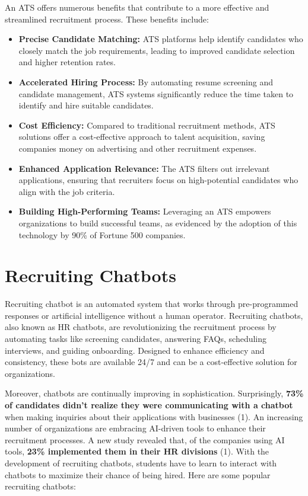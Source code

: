 \documentclass[
]{book}
\begin{document}
An ATS offers numerous benefits that contribute to a more effective and streamlined recruitment process. These benefits include:

\begin{itemize}
\item
  \textbf{Precise Candidate Matching:} ATS platforms help identify candidates who closely match the job requirements, leading to improved candidate selection and higher retention rates.
\item
  \textbf{Accelerated Hiring Process:} By automating resume screening and candidate management, ATS systems significantly reduce the time taken to identify and hire suitable candidates.
\item
  \textbf{Cost Efficiency:} Compared to traditional recruitment methods, ATS solutions offer a cost-effective approach to talent acquisition, saving companies money on advertising and other recruitment expenses.
\item
  \textbf{Enhanced Application Relevance:} The ATS filters out irrelevant applications, ensuring that recruiters focus on high-potential candidates who align with the job criteria.
\item
  \textbf{Building High-Performing Teams:} Leveraging an ATS empowers organizations to build successful teams, as evidenced by the adoption of this technology by 90\% of Fortune 500 companies.
\end{itemize}

\hypertarget{recruiting-chatbots}{%
\chapter{Recruiting Chatbots}\label{recruiting-chatbots}}

Recruiting chatbot is an automated system that works through pre-programmed responses or artificial intelligence without a human operator. Recruiting chatbots, also known as HR chatbots, are revolutionizing the recruitment process by automating tasks like screening candidates, answering FAQs, scheduling interviews, and guiding onboarding. Designed to enhance efficiency and consistency, these bots are available 24/7 and can be a cost-effective solution for organizations.

Moreover, chatbots are continually improving in sophistication. Surprisingly, \textbf{73\% of candidates didn't realize they were communicating with a chatbot} when making inquiries about their applications with businesses (1). An increasing number of organizations are embracing AI-driven tools to enhance their recruitment processes. A new study revealed that, of the companies using AI tools, \textbf{23\% implemented them in their HR divisions} (1). With the development of recruiting chatbots, students have to learn to interact with chatbots to maximize their chance of being hired. Here are some popular recruiting chatbots:
\end{document}
